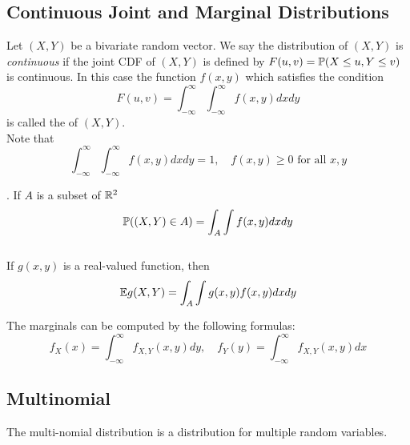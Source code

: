 \subsection{Continuous Joint and Marginal Distributions}
\begin{definition}
    Let $(X,Y)$ be a bivariate random vector. We say the distribution of $(X,Y)$ is \textit{continuous} if the joint CDF of $(X,Y)$ is defined by $F(u, v) = \mathbb P(X \leq u, Y \leq v)$ is continuous. In this case the function $f(x,y)$ which satisfies the condition
    $$
    F(u, v) = \int_{ -\infty}^{\infty} \int_{-\infty}^{\infty} f(x,y)dxdy
    $$
    is called the  of $(X,Y)$.
    \\
    Note that 
    $$
    \int_{ -\infty}^{\infty} \int_{-\infty}^{\infty} f(x,y)dxdy = 1, \quad
    f(x,y) \geq 0 \text{ for all } x,y
    $$
\end{definition}

\begin{note}
    . If $A$ is a subset of $\mathbb R^2$
    $$
     \mathbb P((X,Y) \in A) = \int_{A} \int f(x,y)dxdy 
    $$
    \\
     If $g(x,y)$ is a real-valued function, then
    $$
    \mathbb E g(X,Y) = \int_{A} \int g(x,y) f(x,y)dxdy
    $$
\end{note}

The marginals can be computed by the following formulas:
$$
f_X(x) = \int_{ -\infty}^{\infty} f_{X,Y}(x,y) dy, \quad  f_Y(y) = \int_{ -\infty}^{\infty} f_{X,Y}(x,y) dx
$$
\subsection{Multinomial}
The multi-nomial distribution is a  distribution for multiple random variables. 
